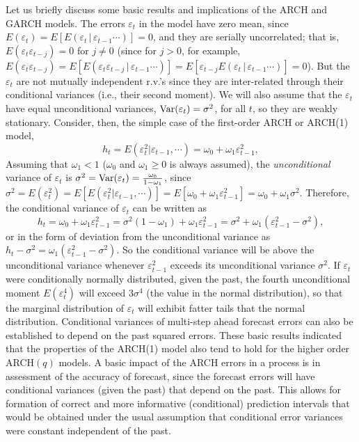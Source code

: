 Let us briefly discuss some basic results and implications of the ARCH and GARCH models. The errors $\varepsilon_t$ in the model have zero mean, since $E(\varepsilon_t) = E[E(\varepsilon_t\,|\,\varepsilon_{t-1}\cdots)] = 0$, and they are serially uncorrelated; that is, $E(\varepsilon_t\varepsilon_{t-j}) = 0$ for $j \not= 0$ (since for $j > 0$, for example, $E(\varepsilon_t\varepsilon_{t-j}) = E[E(\varepsilon_t\varepsilon_{t-j}\,|\,\varepsilon_{t-1}\cdots)] = E[\varepsilon_{t-j}E(\varepsilon_t\,|\,\varepsilon_{t-1}\cdots)] = 0$). But the $\varepsilon_t$ are not mutually independent r.v.'s since they are inter-related through their conditional variances (i.e., their second moment). We will also assume that the $\varepsilon_t$ have equal unconditional variances, $\operatorname{Var}(\varepsilon_t) = \sigma^2$, for all $t$, so they are weakly stationary. Consider, then, the simple case of the first-order ARCH or ARCH(1) model,
	\begin{equation}\label{eqn:2htE}
	h_t = E(\varepsilon_t^2|\varepsilon_{t-1},\cdots) = \omega_0 + \omega_1\varepsilon_{t-1}^2,
	\end{equation}
Assuming that $\omega_1 < 1$ ($\omega_0$ and $\omega_1 \geq 0$ is always assumed), the \textit{unconditional} variance of $\varepsilon_t$ is $\sigma^2= \operatorname{Var}(\varepsilon_t) = \frac{\omega_0}{1 - \omega_1}$, since $\sigma^2 = E(\varepsilon_t^2) = E[E(\varepsilon_t^2|\varepsilon_{t-1},\cdots)] = E[\omega_0 + \omega_1\varepsilon_{t-1}^2] = \omega_0 + \omega_1\sigma^2$. Therefore, the conditional variance of $\varepsilon_t$ can be written as
	\begin{equation}\label{eqn:2htw}
	h_t = \omega_0 + \omega_1\varepsilon_{t-1}^2 = \sigma^2(1 - \omega_1) + \omega_1\varepsilon_{t-1}^2 = \sigma^2 + \omega_1(\varepsilon_{t-1}^2 - \sigma^2),
	\end{equation}
or in the form of deviation from the unconditional variance as $h_t - \sigma^2= \omega_1(\varepsilon_{t-1}^2 - \sigma^2)$. So the conditional variance will be above the unconditional variance whenever $\varepsilon_{t-1}^2$ exceeds its unconditional variance $\sigma^2$. If $\varepsilon_t$ were conditionally normally distributed, given the past, the fourth unconditional moment $E(\varepsilon_t^4)$ will exceed $3\sigma^4$ (the value in the normal distribution), so that the marginal distribution of $\varepsilon_t$ will exhibit fatter tails that the normal distribution. Conditional variances of multi-step ahead forecast errors can also be established to depend on the past squared errors. These basic results indicated that the properties of the ARCH(1) model also tend to hold for the higher order ARCH$(q)$ models. A basic impact of the ARCH errors in a process is in assessment of the accuracy of forecast, since the forecast errors will have conditional variances (given the past) that depend on the past. This allows for formation of correct and more informative (conditional) prediction intervals that would be obtained under the usual assumption that conditional error variances were constant independent of the past.


